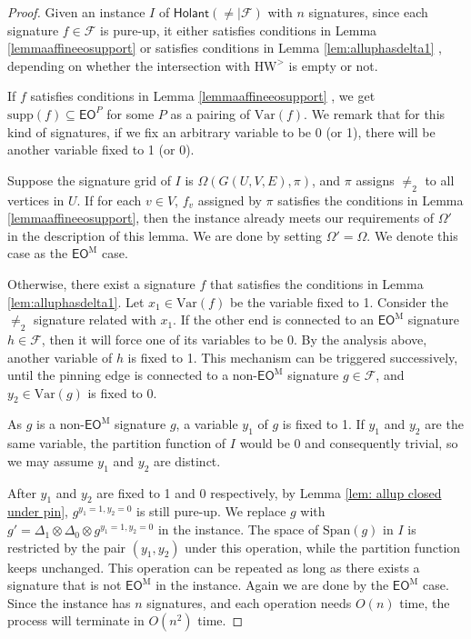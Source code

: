 \documentclass[a4paper,UKenglish,cleveref, autoref, thm-restate]{lipics-v2021}
\newcommand{\hol}[0]{\textsf{Holant}}
\newcommand{\hw}[1]{\text{HW}^{#1}}
\newcommand{\su}[0]{\text{supp}}
\newcommand{\eom}[1][\text{M}]{\textsf{EO}^{#1}}
\begin{document}
\begin{proof}


Given an instance $I$ of $\hol(\neq\mid\mathcal{F})$ with $n$ signatures, since each signature $f\in \mathcal{F}$ is pure-up, it either satisfies conditions in Lemma \ref{lemmaaffineeosupport}   or satisfies conditions in Lemma \ref{lem:alluphasdelta1} , depending on whether the intersection with $\hw{>}$ is empty or not. 

If $f$ satisfies conditions in Lemma \ref{lemmaaffineeosupport} , we get $\su{(f)} \subseteq \eom[P]$ for some $P$ as a pairing of $\text{Var}(f)$. We remark that for this kind of signatures, if we fix an arbitrary variable to be 0 (or 1), there will be another variable fixed to 1 (or 0).

Suppose the signature grid of $I$ is $\Omega(G(U,V,E),\pi)$, and $\pi$ assigns $\neq_2$ to all vertices in $U$. If for each $v\in V$, $f_v$ assigned by $\pi$ satisfies the conditions in Lemma \ref{lemmaaffineeosupport}, then the instance already meets our requirements of $\Omega'$ in the description of this lemma. We are done by setting $\Omega'=\Omega$. We denote this case as the $\eom$ case.

Otherwise, there exist a signature $f$ that satisfies the conditions in Lemma \ref{lem:alluphasdelta1}. Let $x_1\in\text{Var}(f)$ be the variable fixed to 1. Consider the $\neq_2$ signature related with $x_1$. If the other end is connected to an $\eom$ signature $h\in\mathcal{F}$, then it will force one of its variables to be 0. By the analysis above, another variable of $h$ is fixed to 1. This mechanism can be triggered successively, until the pinning edge is connected to a non-$\eom$ signature $g\in\mathcal{F}$, and $y_2\in\text{Var}(g)$ is fixed to 0. 

As $g$ is a non-$\eom$ signature $g$, a variable $y_1$ of $g$ is fixed to 1. If $y_1$ and $y_2$ are the same variable, the partition function of $I$ would be 0 and consequently trivial, so we may assume $y_1$ and $y_2$ are distinct. 

After $y_1$ and $y_2$ are fixed to 1 and 0 respectively, by Lemma \ref{lem: allup closed under pin}, $g^{y_1=1,y_2=0}$ is still pure-up. We replace $g$ with $g'=\Delta_1\otimes\Delta_0\otimes g^{y_1=1,y_2=0}$ in the instance. The space of $\text{Span}(g)$ in $I$ is restricted by the pair $(y_1,y_2)$ under this operation, while the partition function keeps unchanged. This operation can be repeated as long as there exists a signature that is not $\eom$ in the instance. Again we are done by the $\eom$ case. Since the instance has $n$ signatures, and each operation needs $O(n)$ time, the process will terminate in $O(n^2)$ time.
\end{proof}
\end{document}
